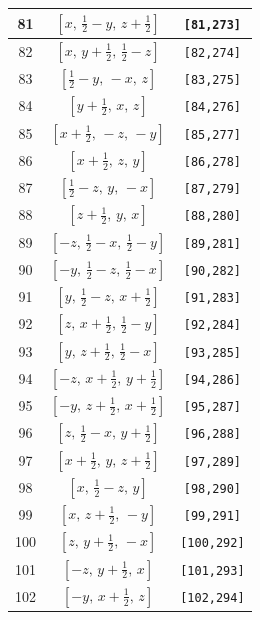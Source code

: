 \documentclass[fleqn,8pt]{jsarticle}
\begin{document}
\begin{longtable}{ccc}
81 & $\left[ x,\, \frac{1}{2} - y,\, z + \frac{1}{2} \right]$ & {\tt [81,273]} \\ \hline
82 & $\left[ x,\, y + \frac{1}{2},\, \frac{1}{2} - z \right]$ & {\tt [82,274]} \\ \hline
83 & $\left[ \frac{1}{2} - y,\, - x,\, z \right]$ & {\tt [83,275]} \\ \hline
84 & $\left[ y + \frac{1}{2},\, x,\, z \right]$ & {\tt [84,276]} \\ \hline
85 & $\left[ x + \frac{1}{2},\, - z,\, - y \right]$ & {\tt [85,277]} \\ \hline
86 & $\left[ x + \frac{1}{2},\, z,\, y \right]$ & {\tt [86,278]} \\ \hline
87 & $\left[ \frac{1}{2} - z,\, y,\, - x \right]$ & {\tt [87,279]} \\ \hline
88 & $\left[ z + \frac{1}{2},\, y,\, x \right]$ & {\tt [88,280]} \\ \hline
89 & $\left[ - z,\, \frac{1}{2} - x,\, \frac{1}{2} - y \right]$ & {\tt [89,281]} \\ \hline
90 & $\left[ - y,\, \frac{1}{2} - z,\, \frac{1}{2} - x \right]$ & {\tt [90,282]} \\ \hline
91 & $\left[ y,\, \frac{1}{2} - z,\, x + \frac{1}{2} \right]$ & {\tt [91,283]} \\ \hline
92 & $\left[ z,\, x + \frac{1}{2},\, \frac{1}{2} - y \right]$ & {\tt [92,284]} \\ \hline
93 & $\left[ y,\, z + \frac{1}{2},\, \frac{1}{2} - x \right]$ & {\tt [93,285]} \\ \hline
94 & $\left[ - z,\, x + \frac{1}{2},\, y + \frac{1}{2} \right]$ & {\tt [94,286]} \\ \hline
95 & $\left[ - y,\, z + \frac{1}{2},\, x + \frac{1}{2} \right]$ & {\tt [95,287]} \\ \hline
96 & $\left[ z,\, \frac{1}{2} - x,\, y + \frac{1}{2} \right]$ & {\tt [96,288]} \\ \hline
97 & $\left[ x + \frac{1}{2},\, y,\, z + \frac{1}{2} \right]$ & {\tt [97,289]} \\ \hline
98 & $\left[ x,\, \frac{1}{2} - z,\, y \right]$ & {\tt [98,290]} \\ \hline
99 & $\left[ x,\, z + \frac{1}{2},\, - y \right]$ & {\tt [99,291]} \\ \hline
100 & $\left[ z,\, y + \frac{1}{2},\, - x \right]$ & {\tt [100,292]} \\ \hline
101 & $\left[ - z,\, y + \frac{1}{2},\, x \right]$ & {\tt [101,293]} \\ \hline
102 & $\left[ - y,\, x + \frac{1}{2},\, z \right]$ & {\tt [102,294]} \\ \hline

\end{longtable}
\end{document}
